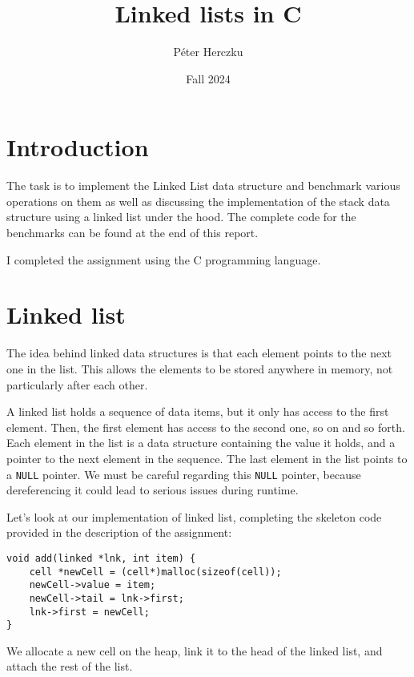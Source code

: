 \documentclass[a4paper,11pt]{article}
\begin{document}
    \title{
        \textbf{Linked lists in C}
    }
    \author{Péter Herczku}
    \date{Fall 2024}

    \maketitle

    \section*{Introduction}

    The task is to implement the Linked List data structure and benchmark various operations on them as well as discussing the implementation of the stack data structure using a linked list under the hood.
    The complete code for the benchmarks can be found at the end of this report.

    I completed the assignment using the C programming language.

    \section*{Linked list}

    The idea behind linked data structures is that each element points to the next one in the list.
    This allows the elements to be stored anywhere in memory, not particularly after each other.

    A linked list holds a sequence of data items, but it only has access to the first element.
    Then, the first element has access to the second one, so on and so forth.
    Each element in the list is a data structure containing the value it holds, and a pointer to the next element in the sequence.
    The last element in the list points to a {\tt NULL} pointer.
    We must be careful regarding this {\tt NULL} pointer, because dereferencing it could lead to serious issues during runtime.

    Let's look at our implementation of linked list, completing the skeleton code provided in the description of the assignment:

    \begin{verbatim}
void add(linked *lnk, int item) {
    cell *newCell = (cell*)malloc(sizeof(cell));
    newCell->value = item;
    newCell->tail = lnk->first;
    lnk->first = newCell;
}
    \end{verbatim}

    We allocate a new cell on the heap, link it to the head of the linked list, and attach the rest of the list.
\end{document}
